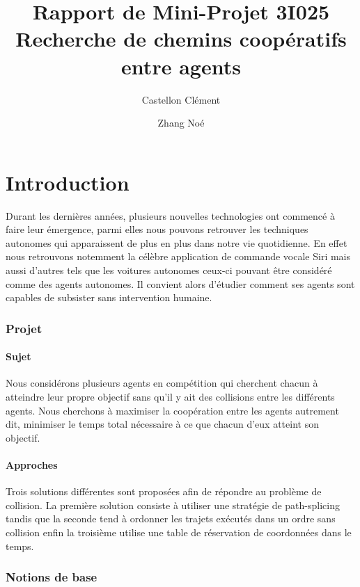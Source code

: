 \documentclass[a4paper, twocolumn]{article}
\begin{document}
	\title{Rapport de Mini-Projet 3I025 \\
		\large Recherche de chemins coopératifs entre agents}
	\author{Castellon Clément \and Zhang Noé}
	\maketitle

	\part{Introduction}
	
		Durant les dernières années, plusieurs nouvelles technologies ont commencé à faire leur émergence, parmi elles nous pouvons retrouver les techniques autonomes qui apparaissent de plus en plus dans notre vie quotidienne. En effet nous retrouvons notemment la célèbre application de commande vocale Siri mais aussi d'autres tels que les voitures autonomes ceux-ci pouvant être considéré comme des agents autonomes.
		Il convient alors d'étudier comment ses agents sont capables de subsister sans intervention humaine. 
		
		\section{Projet}
		
		\subsection{Sujet}
		Nous considérons plusieurs agents en compétition qui cherchent chacun à atteindre leur propre objectif sans qu'il y ait des collisions entre les différents agents.
		Nous cherchons à maximiser la coopération entre les agents autrement dit, minimiser le temps total nécessaire à ce que chacun d'eux atteint son objectif.
		
		\subsection{Approches}
		Trois solutions différentes sont proposées afin de répondre au problème de collision. La première solution consiste à utiliser une stratégie de path-splicing tandis que la seconde tend à ordonner les trajets exécutés dans un ordre sans collision enfin la troisième utilise une table de réservation de coordonnées dans le temps.
	
		\section{Notions de base}
		
\end{document}
